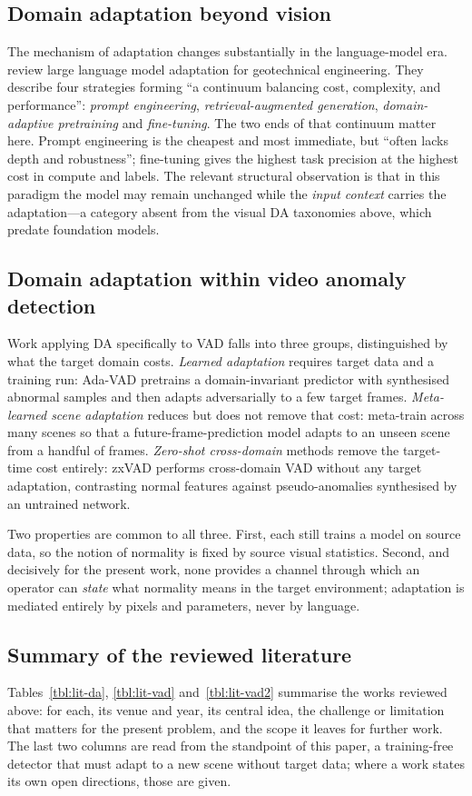 \documentclass[a4paper,fleqn]{cas-sc}
\begin{document}
\subsection{Domain adaptation beyond vision}
The mechanism of adaptation changes substantially in the language-model era.
\citet{fan2026llm} review large language model adaptation for geotechnical
engineering. They describe four strategies forming ``a continuum balancing cost,
complexity, and performance'': \emph{prompt engineering},
\emph{retrieval-augmented generation}, \emph{domain-adaptive pretraining} and
\emph{fine-tuning}. The two ends of that continuum matter here. Prompt
engineering is the cheapest and most immediate, but ``often lacks depth and
robustness''; fine-tuning gives the highest task precision at the highest cost
in compute and labels.
The relevant structural observation is that in this paradigm the model may remain
unchanged while the \emph{input context} carries the adaptation---a category
absent from the visual DA taxonomies above, which predate foundation models.

\subsection{Domain adaptation within video anomaly detection}
Work applying DA specifically to VAD falls into three groups, distinguished by
what the target domain costs. \emph{Learned adaptation} requires target data and
a training run: Ada-VAD \citep{adavad2024} pretrains a domain-invariant predictor
with synthesised abnormal samples and then adapts adversarially to a few target
frames. \emph{Meta-learned scene adaptation} reduces but does not remove that
cost: \citet{lu2020fewshot} meta-train across many scenes so that a
future-frame-prediction model adapts to an unseen scene from a handful of frames.
\emph{Zero-shot cross-domain} methods remove the target-time cost entirely: zxVAD
\citep{aich2023zxvad} performs cross-domain VAD without any target adaptation,
contrasting normal features against pseudo-anomalies synthesised by an untrained
network.

Two properties are common to all three. First, each still trains a model on
source data, so the notion of normality is fixed by source visual statistics.
Second, and decisively for the present work, none provides a channel through
which an operator can \emph{state} what normality means in the target
environment; adaptation is mediated entirely by pixels and parameters, never by
language.

\subsection{Summary of the reviewed literature}
\label{sec:lit-summary}
Tables~\ref{tbl:lit-da}, \ref{tbl:lit-vad} and~\ref{tbl:lit-vad2} summarise the works reviewed above:
for each, its venue and year, its central idea, the challenge or limitation that
matters for the present problem, and the scope it leaves for further work. The
last two columns are read from the standpoint of this paper, a training-free
detector that must adapt to a new scene without target data; where a work states
its own open directions, those are given.
\end{document}
